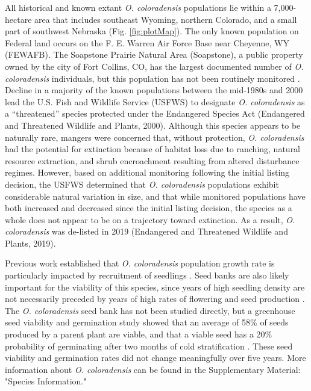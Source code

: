 \documentclass[12pt, letterpaper]{article}
\begin{document}
All historical and known extant \textit{O. coloradensis} populations lie within a 7,000-hectare area that includes southeast Wyoming, northern Colorado, and a small part of southwest Nebraska (Fig. \ref{fig:plotMap}). The only known population on Federal land occurs on the F. E. Warren Air Force Base near Cheyenne, WY (FEWAFB). The Soapstone Prairie Natural Area (Soapstone), a public property owned by the city of Fort Collins, CO, has the largest documented number of \textit{O. coloradensis} individuals, but this population has not been routinely monitored \cite{Heidel202133-YearWyoming}. Decline in a majority of the known populations between the mid-1980s and 2000 lead the U.S. Fish and Wildlife Service (USFWS) to designate \textit{O. coloradensis} as a “threatened” species protected under the Endangered Species Act (Endangered and Threatened Wildlife and Plants, 2000). Although this species appears to be naturally rare, mangers were concerned that, without protection, \textit{O. coloradensis} had the potential for extinction because of habitat loss due to ranching, natural resource extraction, and shrub encroachment resulting from altered disturbance regimes. However, based on additional monitoring following the initial listing decision, the USFWS determined that \textit{O. coloradensis} populations exhibit considerable natural variation in size, and that while monitored populations have both increased and decreased since the initial listing decision, the species as a whole does not appear to be on a trajectory toward extinction. As a result, \textit{O. coloradensis} was de-listed in 2019 (Endangered and Threatened Wildlife and Plants, 2019).
\nocite{USFWS2019}
\nocite{USFWS2000}

Previous work established that \textit{O. coloradensis} population growth rate is particularly impacted by recruitment of seedlings \cite{Floyd1998}. Seed banks are also likely important for the viability of this species, since years of high seedling density are not necessarily preceded by years of high rates of flowering and seed production \cite{Munk2002RosetteSpecies, Heidel202133-YearWyoming}. The \textit{O. coloradensis} seed bank has not been studied directly, but a greenhouse seed viability and germination study showed that an average of 58\% of seeds produced by a parent plant are viable, and that a viable seed has a 20\% probability of germinating after two months of cold stratification \cite{Burgess2005CapsuleColoradensis}. These seed viability and germination rates did not change meaningfully over five years. More information about \textit{O. coloradensis} can be found in the Supplementary Material: "Species Information."
\end{document}
